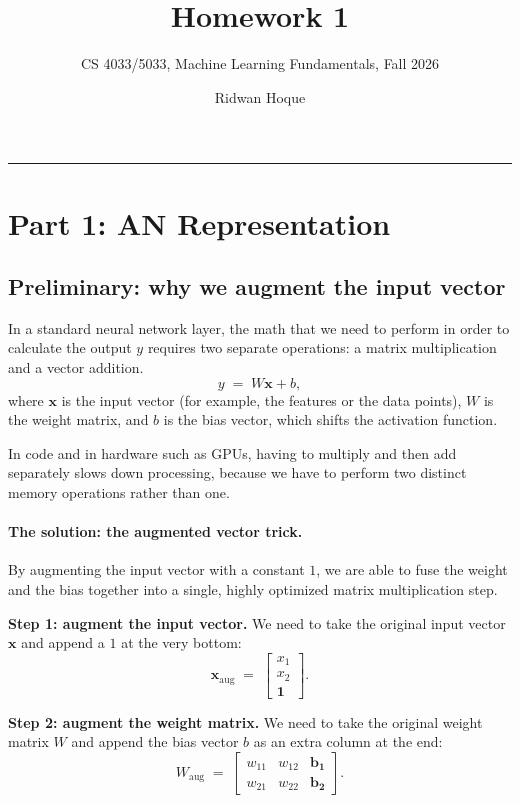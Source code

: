 \documentclass[11pt]{article}
\title{\vspace{-1.2cm}\textbf{Homework 1}}
\author{CS 4033/5033, Machine Learning Fundamentals, Fall 2026}
\date{Ridwan Hoque}
\newcommand{\bx}{\mathbf{x}}
\begin{document}
\maketitle
\vspace{-0.8cm}

\noindent\rule{\textwidth}{0.4pt}

\section*{Part 1: AN Representation}

\subsection*{Preliminary: why we augment the input vector}

In a standard neural network layer, the math that we need to perform in order to
calculate the output $y$ requires two separate operations: a matrix multiplication
and a vector addition.
\[
y \;=\; W\bx + b ,
\]
where $\bx$ is the input vector (for example, the features or the data points),
$W$ is the weight matrix, and $b$ is the bias vector, which shifts the activation
function.

In code and in hardware such as GPUs, having to multiply and then add separately
slows down processing, because we have to perform two distinct memory operations
rather than one.

\paragraph{The solution: the augmented vector trick.}
By augmenting the input vector with a constant $1$, we are able to fuse the weight
and the bias together into a single, highly optimized matrix multiplication step.

\medskip
\noindent\textbf{Step 1: augment the input vector.}
We need to take the original input vector $\bx$ and append a $1$ at the very bottom:
\[
\bx_{\text{aug}} \;=\;
\begin{bmatrix} x_1 \\ x_2 \\ \mathbf{1} \end{bmatrix} .
\]

\noindent\textbf{Step 2: augment the weight matrix.}
We need to take the original weight matrix $W$ and append the bias vector $b$ as an
extra column at the end:
\[
W_{\text{aug}} \;=\;
\begin{bmatrix}
w_{11} & w_{12} & \mathbf{b_1} \\
w_{21} & w_{22} & \mathbf{b_2}
\end{bmatrix} .
\]
\end{document}

